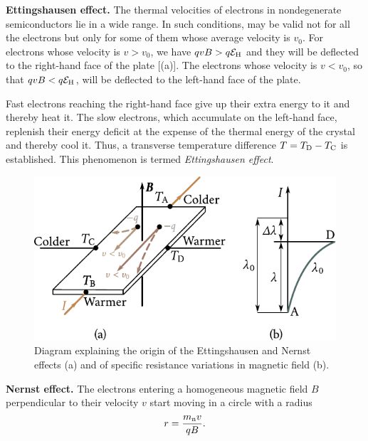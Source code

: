 \textbf{Ettingshausen effect.} The thermal velocities of electrons in nondegenerate semiconductors lie in a wide range. In such conditions,  may be valid not for all the electrons but only for some of them whose average velocity is $v_0$. For electrons whose velocity is $v>v_0$, we have $qvB>q\mathcal{E}_{\text{H}}$ and they will be deflected to the right-hand face of the plate [(a)]. The electrons whose velocity is $v<v_0$, so that $qvB<q\mathcal{E}_{\text{H}}$, will be deflected to the left-hand face of the plate.

Fast electrons reaching the right-hand face give up their extra energy to it and thereby heat it. The slow electrons, which accumulate on the left-hand face, replenish their energy deficit at the expense of the thermal energy of the crystal and thereby cool it. Thus, a transverse temperature difference $T=T_{\text{D}}-T_{\text{C}}$ is established. This phenomenon is termed \textit{Ettingshausen effect}.

\begin{figure}[t]
	\begin{center}
		\includegraphics[scale=1]{figures/ch_09/fig_9_6.pdf}
		\caption[]{Diagram explaining the origin of the Ettingshausen and Nernst effects (a) and of specific resistance variations in magnetic field (b).}
		\label{fig:9_6}
	\end{center}
	\vspace{-0.8cm}
\end{figure}

\textbf{Nernst effect.} The electrons entering a homogeneous magnetic field $B$ perpendicular to their velocity $v$ start moving in a circle with a radius
\begin{equation}\label{eq:9_40}
    r = \frac{m_{\text{n}} v}{q B}.
\end{equation}

